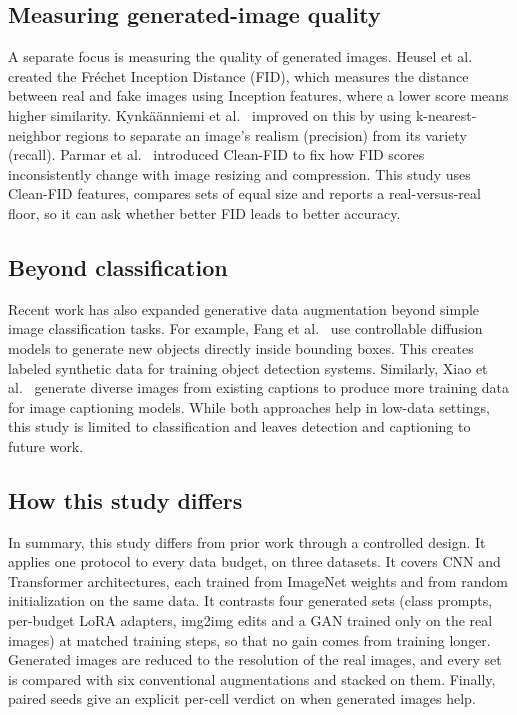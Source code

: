 \subsection{Measuring generated-image quality}
A separate focus is measuring the quality of generated images. Heusel et al.~\cite{heusel2017gans} created the Fréchet Inception Distance (FID), which measures the distance between real and fake images using Inception features, where a lower score means higher similarity. Kynkäänniemi et al.~\cite{kynkaanniemi2019improved} improved on this by using k-nearest-neighbor regions to separate an image's realism (precision) from its variety (recall). Parmar et al.~\cite{parmar2022aliased} introduced Clean-FID to fix how FID scores inconsistently change with image resizing and compression. This study uses Clean-FID features, compares sets of equal size and reports a real-versus-real floor, so it can ask whether better FID leads to better accuracy.

\subsection{Beyond classification}
Recent work has also expanded generative data augmentation beyond simple image classification tasks. For example, Fang et al.~\cite{fang2024data} use controllable diffusion models to generate new objects directly inside bounding boxes. This creates labeled synthetic data for training object detection systems. Similarly, Xiao et al.~\cite{xiao2023multimodal} generate diverse images from existing captions to produce more training data for image captioning models. While both approaches help in low-data settings, this study is limited to classification and leaves detection and captioning to future work.

\subsection{How this study differs}
In summary, this study differs from prior work through a controlled design. It applies one protocol to every data budget, on three datasets. It covers CNN and Transformer architectures, each trained from ImageNet weights and from random initialization on the same data. It contrasts four generated sets (class prompts, per-budget LoRA adapters, img2img edits and a GAN trained only on the real images) at matched training steps, so that no gain comes from training longer. Generated images are reduced to the resolution of the real images, and every set is compared with six conventional augmentations and stacked on them. Finally, paired seeds give an explicit per-cell verdict on when generated images help.
